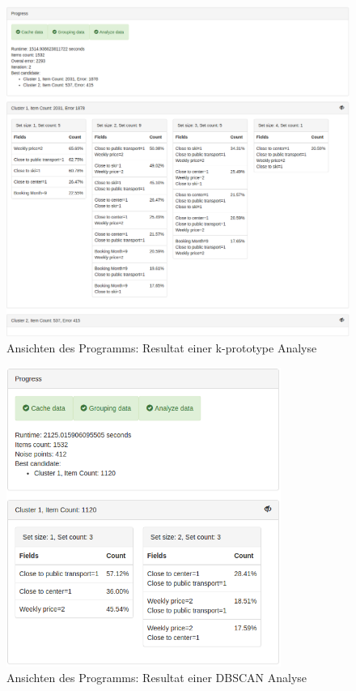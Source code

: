 \begin{figure}[H]
	\RawFloats
	\centering
	\includegraphics[width=1\textwidth]{images/program-kprototype-results}
	\caption{Ansichten des Programms: Resultat einer k-prototype Analyse}
\end{figure}
\begin{figure}[H]
	\RawFloats
	\centering
	\includegraphics[width=0.8\textwidth]{images/program-dbscan-results}
	\caption{Ansichten des Programms: Resultat einer DBSCAN Analyse}
\end{figure}
